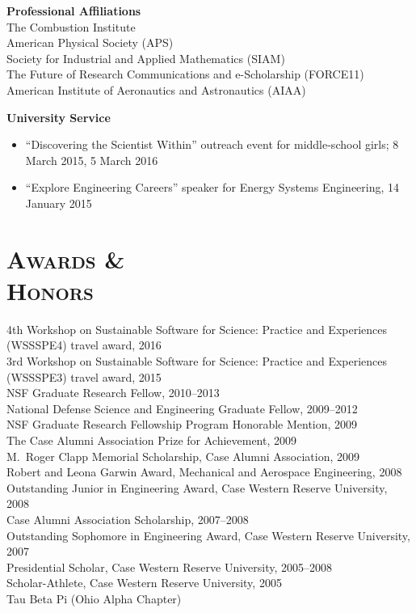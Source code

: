 \documentclass[margin,line,11pt]{res}
\begin{document}
\begin{resume}
\textbf{Professional Affiliations} \\
The Combustion Institute \\
American Physical Society (APS) \\
Society for Industrial and Applied Mathematics (SIAM) \\
The Future of Research Communications and e-Scholarship (FORCE11) \\
American Institute of Aeronautics and Astronautics (AIAA)

\textbf{University Service}
\begin{itemize}[leftmargin=*]
\item ``Discovering the Scientist Within'' outreach event for middle-school girls; 8 March 2015, 5 March 2016
\item ``Explore Engineering Careers'' speaker for Energy Systems Engineering, 14 January 2015
\end{itemize}

\section{\textsc{Awards \& \\Honors}}
4th Workshop on Sustainable Software for Science: Practice and Experiences (WSSSPE4) travel award, 2016 \\
3rd Workshop on Sustainable Software for Science: Practice and Experiences (WSSSPE3) travel award, 2015 \\
NSF Graduate Research Fellow, 2010--2013 \\
National Defense Science and Engineering Graduate Fellow, 2009--2012 \\
NSF Graduate Research Fellowship Program Honorable Mention, 2009 \\
The Case Alumni Association Prize for Achievement, 2009 \\
M.\ Roger Clapp Memorial Scholarship, Case Alumni Association, 2009 \\
Robert and Leona Garwin Award, Mechanical and Aerospace Engineering, 2008 \\
Outstanding Junior in Engineering Award, Case Western Reserve University, 2008 \\
Case Alumni Association Scholarship, 2007--2008 \\
Outstanding Sophomore in Engineering Award, Case Western Reserve University, 2007 \\
Presidential Scholar, Case Western Reserve University, 2005--2008 \\
Scholar-Athlete, Case Western Reserve University, 2005 \\
Tau Beta Pi (Ohio Alpha Chapter)


\end{resume}
\end{document}
